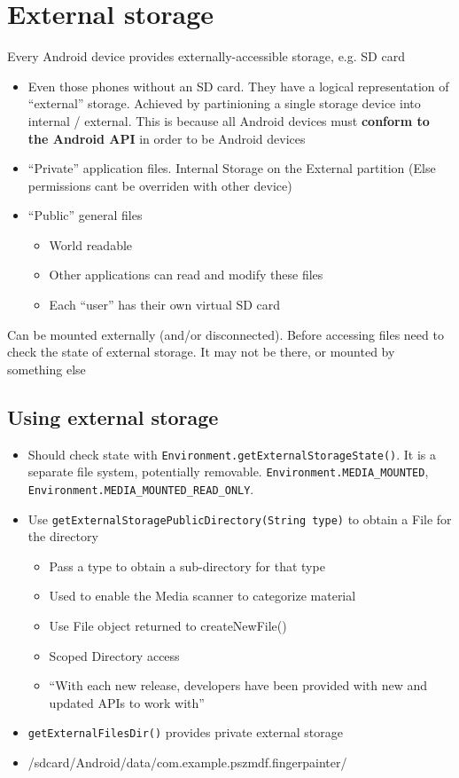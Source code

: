 \documentclass{article}
\begin{document}
\section{External storage}
\begin{flushleft}
Every	Android	device	provides	externally-accessible	storage,	e.g.	SD	card
\begin{itemize}
  \item Even those phones without an SD card. They have a logical representation of “external” storage. Achieved by partinioning a single storage device into internal / external. This is because all Android devices must \textbf{conform to the Android API} in order to be Android devices 
  \item “Private” application files. Internal Storage on the External partition (Else permissions cant be overriden with other device) 
  \item “Public” general files
  \begin{itemize}
    \item World readable 
    \item Other applications can read and modify these files 
    \item Each “user” has their own virtual SD card
  \end{itemize}
\end{itemize}
Can be mounted externally (and/or disconnected). Before accessing files need to check the state of external storage. It may not be there, or mounted by something else
\end{flushleft}

\subsection{Using external storage}

\begin{itemize}
  \item Should check state with \verb|Environment.getExternalStorageState()|. It is a separate file system, potentially removable. \verb|Environment.MEDIA_MOUNTED|, \verb|Environment.MEDIA_MOUNTED_READ_ONLY|.
  \item Use \texttt{getExternalStoragePublicDirectory(String type)} to obtain a File for the directory
  \begin{itemize}
    \item Pass a type to obtain a sub-directory for that type 
    \item Used to enable the Media scanner to categorize material 
    \item Use File object returned to createNewFile() 
    \item Scoped Directory access 
    \item “With each new release, developers have been provided with new and updated APIs to work with”
  \end{itemize}
  \item \verb|getExternalFilesDir()| provides private external storage 
  \item /sdcard/Android/data/com.example.pszmdf.fingerpainter/
\end{itemize}
\end{document}

